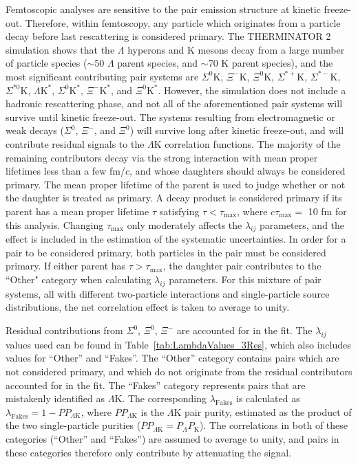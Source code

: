 \documentclass[ALICE,manyauthors]{cernphprep}
\newcommand{\Lam}{$\Lambda$\xspace}
\newcommand{\LamK}{$\Lambda$K\xspace}
\begin{document}
Femtoscopic analyses are sensitive to the pair emission structure at kinetic freeze-out.
Therefore, within femtoscopy, any particle which originates from a particle decay before last rescattering is considered primary.
The THERMINATOR 2 simulation shows that the \Lam hyperons and K mesons decay from a large number of particle species ($\sim$50 \Lam parent species, and $\sim$70 K parent species), and the most significant contributing pair systems are $\Sigma^{0}$K, $\Xi^{-}$K, $\Xi^{0}$K, $\Sigma^{*+}$K, $\Sigma^{*-}$K, $\Sigma^{*0}$K, $\Lambda\mathrm{K}^{*}$, $\Sigma^{0}\mathrm{K}^{*}$, $\Xi^{-}\mathrm{K}^{*}$, and $\Xi^{0}\mathrm{K}^{*}$.
However, the simulation does not include a hadronic rescattering phase, and not all of the aforementioned pair systems will survive until kinetic freeze-out.
The systems resulting from electromagnetic or weak decays ($\Sigma^{0}$, $\Xi^{-}$, and $\Xi^{0}$) will survive long after kinetic freeze-out, and will contribute residual signals to the \LamK correlation functions.
The majority of the remaining contributors decay via the strong interaction with mean proper lifetimes less than a few fm/$c$, and whose daughters should always be considered primary.
The mean proper lifetime of the parent is used to judge whether or not the daughter is treated as primary.
A decay product is considered primary if its parent has a mean proper lifetime $\tau$ satisfying $\tau < \tau_{\mathrm{max}}$, where $c\tau_{\mathrm{max}} =$ 10 fm for this analysis.
Changing $\tau_{\mathrm{max}}$ only moderately affects the $\lambda_{ij}$ parameters, and the effect is included in the estimation of the systematic uncertainties.
In order for a pair to be considered primary, both particles in the pair must be considered primary. 
If either parent has $\tau > \tau_{\mathrm{max}}$, the daughter pair contributes to the ``Other" category when calculating $\lambda_{ij}$ parameters.
For this mixture of pair systems, all with different two-particle interactions and single-particle source distributions, the net correlation effect is taken to average to unity.


Residual contributions from $\Sigma^{0}$, $\Xi^{0}$, $\Xi^{-}$ are accounted for in the fit.
The $\lambda_{ij}$ values used can be found in Table~\ref{tab:LambdaValues_3Res}, which also includes values for ``Other'' and ``Fakes''.  
The ``Other'' category contains pairs which are not considered primary, and which do not originate from the residual contributors accounted for in the fit.  
The ``Fakes'' category represents pairs that are mistakenly identified as \LamK.
The corresponding $\lambda_{\mathrm{Fakes}}$ is calculated as $\lambda_{\mathrm{Fakes}} = 1-PP_{\Lambda\mathrm{K}}$, where $PP_{\Lambda\mathrm{K}}$ is the \LamK pair purity, estimated as the product of the two single-particle purities ($PP_{\Lambda\mathrm{K}} = P_{\Lambda}P_{\mathrm{K}}$).
The correlations in both of these categories (``Other'' and ``Fakes'') are assumed to average to unity, and pairs in these categories therefore only contribute by attenuating the signal. 
\end{document}
